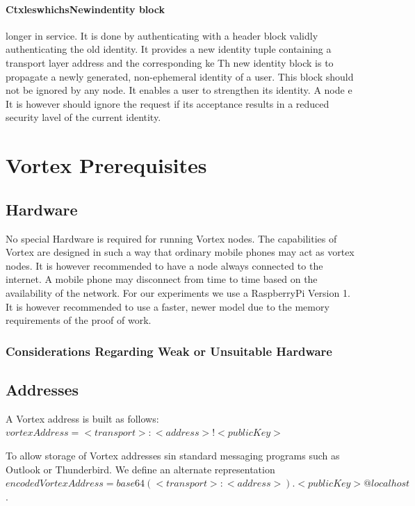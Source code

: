 \subsubsection{CtxleswhichsNewindentity block}                                                                                                                                            longer in service. It  is done by authenticating with a header block validly authenticating the old identity. It provides a new identity tuple containing a transport layer address and the corresponding ke
Th new identity block is to propagate a newly generated, non-ephemeral identity of a user. This block should not be ignored by any node. It enables a user to strengthen its identity. 
             A node                                                                             e
It is however should ignore the request if its acceptance results in a reduced security lavel of the current identity.


\chapter{Vortex Prerequisites}
\section{Hardware}
No special Hardware is required for running Vortex nodes. The capabilities of Vortex are designed in such a way that ordinary mobile phones may act as vortex nodes. It is however recommended to have a node always connected to the internet. A mobile phone may disconnect from time to time based on the availability of the network. For our experiments we use a RaspberryPi Version 1. It is however recommended to use a faster, newer model due to the memory requirements of the proof of work.


\subsection{Considerations Regarding Weak or Unsuitable Hardware}

\section{Addresses}
A Vortex address is built as follows: $vortexAddress=<transport>:<address>!<publicKey>$

To allow storage of Vortex addresses sin standard messaging programs such as Outlook or Thunderbird. We define an alternate representation $encodedVortexAddress=base64(<transport>:<address>).<publicKey>@localhost$. 

